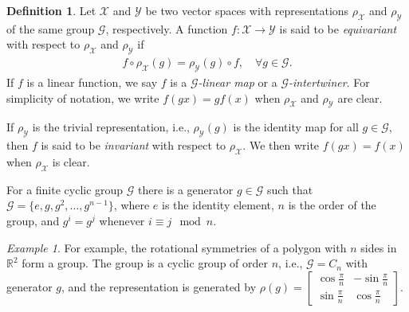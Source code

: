 \documentclass{article}
\newcommand{\G}{\mathcal{G}}
\newcommand{\R}{\mathbb{R}}
\theoremstyle{plain}
\theoremstyle{definition}
\newtheorem{definition}[theorem]{Definition}
\theoremstyle{remark}
\theoremstyle{remark}
\newtheorem{example}[theorem]{Example}
\begin{document}
\begin{definition}
  Let $\mathcal{X}$ and $\mathcal{Y}$ be two vector spaces with representations $\rho_{\mathcal{X}}$ and $\rho_{\mathcal{Y}}$ of the same group $\mathcal{G}$, respectively. 
  A function $f\colon \mathcal{X} \rightarrow \mathcal{Y}$ is said to be \textit{equivariant} with respect to $\rho_{\mathcal{X}}$ and $\rho_{\mathcal{Y}}$ if 
  \begin{align}
    f \circ \rho_{\mathcal{X}}(g) = \rho_{\mathcal{Y}}(g) \circ f, \quad \forall g \in \mathcal{G}.
  \end{align}
    If $f$ is a linear function, we say $f$ is a \textit{$\mathcal{G}$-linear map} or a \textit{$\mathcal{G}$-intertwiner}. 
    For simplicity of notation, we write $f(gx) = gf(x)$ when $\rho_{\mathcal{X}}$ and $\rho_{\mathcal{Y}}$ are clear.  
  
  If $\rho_{\mathcal{Y}}$ is the trivial representation, i.e., $\rho_{\mathcal{Y}}(g)$ is the identity map for all $g \in \mathcal{G}$, then $f$ is said to be \textit{invariant} with respect to $\rho_{\mathcal{X}}$.
  We then write $f(gx) = f(x)$ when $\rho_{\mathcal{X}}$ is clear.
\end{definition} 
For a finite cyclic group $\mathcal{G}$ there is a generator $g\in\mathcal{G}$ such that $\mathcal{G} = \{e, g, g^2, \ldots , g^{n-1}\}$, where $e$ is the identity element, $n$ is the order of the group, and $g^i = g^j$ whenever $i \equiv j \mod n$.

\begin{example}
For example, the rotational symmetries of a polygon with $n$ sides in $\R^2$ form a group. The group is a cyclic group of order $n$, i.e., $\G = C_n$ with generator $g$, and the representation is generated by $\rho(g) = \begin{bmatrix} \cos{\frac{\pi}{n}} & -\sin{\frac{\pi}{n}} \\ \sin{\frac{\pi}{n}} &\cos{\frac{\pi}{n}}  \end{bmatrix}$.
\end{example} 
\end{document}
